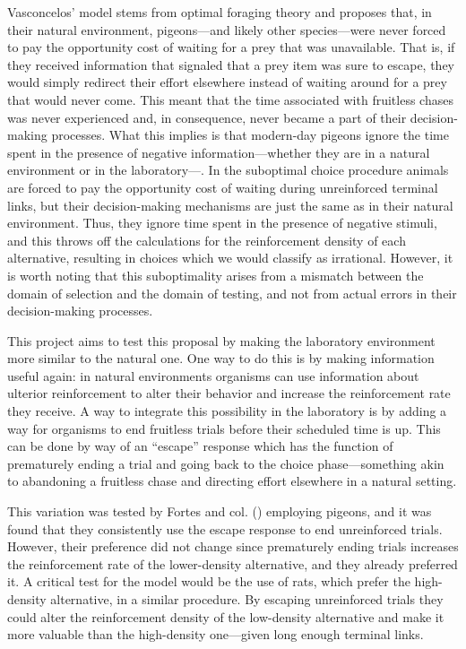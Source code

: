 \documentclass[a4paper,12pt]{article}
\begin{document}
Vasconcelos' model stems from optimal foraging theory and proposes that, in their natural environment, pigeons---and likely other species---were never forced to pay the opportunity cost of waiting for a prey that was unavailable. That is, if they received information that signaled that a prey item was sure to escape, they would simply redirect their effort elsewhere instead of waiting around for a prey that would never come. This meant that the time associated with fruitless chases was never experienced and, in consequence, never became a part of their decision-making processes. What this implies is that modern-day pigeons ignore the time spent in the presence of negative information---whether they are in a natural environment or in the laboratory---. In the suboptimal choice procedure animals are forced to pay the opportunity cost of waiting during unreinforced terminal links, but their decision-making mechanisms are just the same as in their natural environment. Thus, they ignore time spent in the presence of negative stimuli, and this throws off the calculations for the reinforcement density of each alternative, resulting in choices which we would classify as irrational. However, it is worth noting that this suboptimality arises from a mismatch between the domain of selection and the domain of testing, and not from actual errors in their decision-making processes.

This project aims to test this proposal by making the laboratory environment more similar to the natural one. One way to do this is by making information useful again: in natural environments organisms can use information about ulterior reinforcement to alter their behavior and increase the reinforcement rate they receive. A way to integrate this possibility in the laboratory is by adding a way for organisms to end fruitless trials before their scheduled time is up. This can be done by way of an ``escape'' response which has the function of prematurely ending a trial and going back to the choice phase---something akin to abandoning a fruitless chase and directing effort elsewhere in a natural setting.

This variation was tested by Fortes and col. (\citeyear{Fortes2017}) employing pigeons, and it was found that they consistently use the escape response to end unreinforced trials. However, their preference did not change since prematurely ending trials increases the reinforcement rate of the lower-density alternative, and they already preferred it. A critical test for the model would be the use of rats, which prefer the high-density alternative, in a similar procedure. By escaping unreinforced trials they could alter the reinforcement density of the low-density alternative and make it more valuable than the high-density one---given long enough terminal links.
\end{document}
